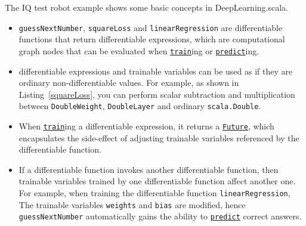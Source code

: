 The IQ test robot example shows some basic concepts in DeepLearning.scala.

\begin{itemize}
  \item \lstinline{guessNextNumber}, \lstinline{squareLoss} and \lstinline{linearRegression} are \glspl{differentiable function} that return \glspl{differentiable expression}, which are \gls{computational graph} nodes that can be evaluated when \href{https://javadoc.io/page/com.thoughtworks.deeplearning/deeplearning_2.11/latest/com/thoughtworks/deeplearning/DeepLearning.html#train(differentiable:Differentiable)(implicitmonoid:algebra.ring.MultiplicativeMonoid[DeepLearning.this.Delta]):com.thoughtworks.future.Future[DeepLearning.this.Data]}{\lstinline{train}}ing or \href{https://javadoc.io/page/com.thoughtworks.deeplearning/deeplearning_2.11/latest/com/thoughtworks/deeplearning/DeepLearning.html#predict(differentiable:Differentiable):com.thoughtworks.future.Future[DeepLearning.this.Data]}{\lstinline{predict}}ing.
  \item \Glspl{differentiable expression} and \glspl{trainable variable} can be used as if they are ordinary non-differentiable values. For example, as shown in Listing~\ref{squareLoss}, you can perform scalar subtraction and multiplication between \lstinline{DoubleWeight}, \lstinline{DoubleLayer} and ordinary \lstinline{scala.Double}.
  \item When \href{https://javadoc.io/page/com.thoughtworks.deeplearning/deeplearning_2.11/latest/com/thoughtworks/deeplearning/DeepLearning.html#train(differentiable:Differentiable)(implicitmonoid:algebra.ring.MultiplicativeMonoid[DeepLearning.this.Delta]):com.thoughtworks.future.Future[DeepLearning.this.Data]}{\lstinline{train}}ing a \gls{differentiable expression}, it returns a \href{https://javadoc.io/page/com.thoughtworks.future/future_2.11/latest/com/thoughtworks/future%24%24Future.html}{\lstinline{Future}}, which encapsulates the side-effect of adjusting \glspl{trainable variable} referenced by the \gls{differentiable function}.
  \item If a \gls{differentiable function} invokes another \gls{differentiable function}, then \glspl{trainable variable} trained by one \gls{differentiable function} affect another one. For example, when training the \gls{differentiable function} \lstinline{linearRegression}, The \glspl{trainable variable} \lstinline{weights} and \lstinline{bias} are modified, hence \lstinline{guessNextNumber} automatically gains the ability to \href{https://javadoc.io/page/com.thoughtworks.deeplearning/deeplearning_2.11/latest/com/thoughtworks/deeplearning/DeepLearning.html#predict(differentiable:Differentiable):com.thoughtworks.future.Future[DeepLearning.this.Data]}{\lstinline{predict}} correct answers.
\end{itemize}

